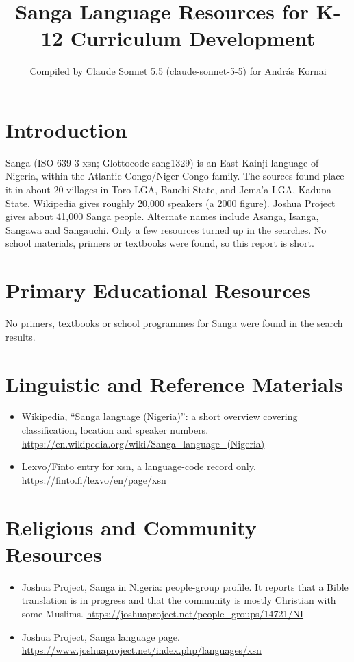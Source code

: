 \documentclass[12pt]{article}
\title{Sanga Language Resources for K-12 Curriculum Development}
\author{Compiled by Claude Sonnet 5.5 (claude-sonnet-5-5) for Andr\'as Kornai}
\date{}
\begin{document}
\maketitle

\section{Introduction}
Sanga (ISO 639-3 xsn; Glottocode sang1329) is an East Kainji language of Nigeria, within the Atlantic-Congo/Niger-Congo family. The sources found place it in about 20 villages in Toro LGA, Bauchi State, and Jema'a LGA, Kaduna State. Wikipedia gives roughly 20,000 speakers (a 2000 figure). Joshua Project gives about 41,000 Sanga people. Alternate names include Asanga, Isanga, Sangawa and Sangauchi. Only a few resources turned up in the searches. No school materials, primers or textbooks were found, so this report is short.

\section{Primary Educational Resources}
No primers, textbooks or school programmes for Sanga were found in the search results.

\section{Linguistic and Reference Materials}
\begin{itemize}
\item Wikipedia, ``Sanga language (Nigeria)'': a short overview covering classification, location and speaker numbers. \url{https://en.wikipedia.org/wiki/Sanga_language_(Nigeria)}
\item Lexvo/Finto entry for xsn, a language-code record only. \url{https://finto.fi/lexvo/en/page/xsn}
\end{itemize}

\section{Religious and Community Resources}
\begin{itemize}
\item Joshua Project, Sanga in Nigeria: people-group profile. It reports that a Bible translation is in progress and that the community is mostly Christian with some Muslims. \url{https://joshuaproject.net/people_groups/14721/NI}
\item Joshua Project, Sanga language page. \url{https://www.joshuaproject.net/index.php/languages/xsn}
\end{itemize}
\end{document}
